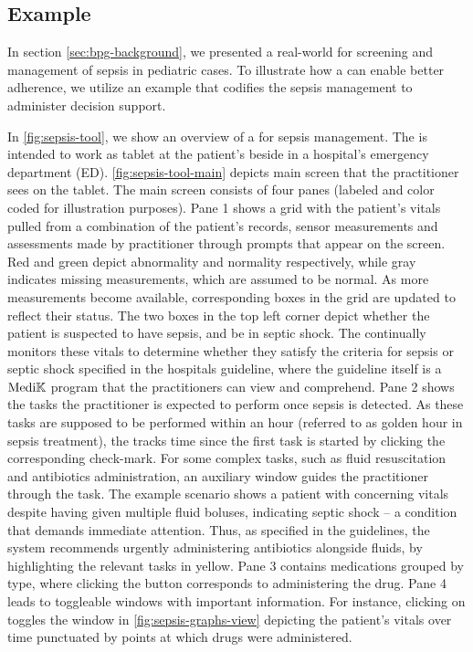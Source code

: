 \subsection{\CDSS{} Example}\label{sec:cdss-example}

In section \ref{sec:bpg-background}, we presented a real-world
\BPG{} for screening and management of sepsis in pediatric cases.
To illustrate how a \CDSSs{} can enable better \BPG{} adherence,
we utilize an example \CDSS{} that codifies the sepsis management \BPG{}
to administer decision support.

In \figurename{} \ref{fig:sepsis-tool}, we show an overview
of a \CDSS{} for sepsis management.
The \CDSS{} is intended to work as tablet at
the patient's beside in a hospital's emergency department (ED).
\figurename{} \ref{fig:sepsis-tool-main} depicts main screen that the practitioner sees on the tablet.
The main screen consists of four panes (labeled and color coded for illustration
purposes). Pane 1 shows a grid with the patient's vitals pulled
from a combination of the patient's records, sensor measurements and
assessments made by practitioner through prompts that appear on the screen.
Red and green depict abnormality and normality respectively, while gray
indicates missing measurements, which are assumed to be normal. As more
measurements become available, corresponding boxes in the grid are updated
to reflect their status. The two boxes in the top left corner depict whether
the patient is suspected to have sepsis, and be in septic shock. The \CDSS{}
continually monitors these vitals to determine whether they satisfy the criteria
for sepsis or septic shock specified in the hospitals guideline, where the
guideline itself is a $\text{Medi}\mathbb{K}{}{}$ program that the practitioners can view and
comprehend. Pane 2 shows the tasks the practitioner is expected to perform
once sepsis is detected. As these tasks are supposed to be performed within an
hour (referred to as golden hour in sepsis treatment), the \CDSS{} tracks time
since the first task is started by clicking the corresponding check-mark.
For some complex tasks, such as fluid resuscitation and antibiotics
administration, an auxiliary window guides the practitioner through the task. The
example scenario shows a patient with concerning vitals despite having
given multiple fluid boluses, indicating septic shock -- a condition that
demands immediate attention. Thus, as specified in the guidelines, the system
recommends urgently administering antibiotics alongside fluids, by highlighting
the relevant tasks in yellow.
Pane 3 contains medications grouped by type, where clicking the
 button corresponds to administering the drug.
Pane 4 leads to toggleable windows with
important information. For instance, clicking on 
toggles the window in \figurename{} \ref{fig:sepsis-graphs-view} depicting
the patient's vitals over time punctuated by points at which
drugs were administered.

